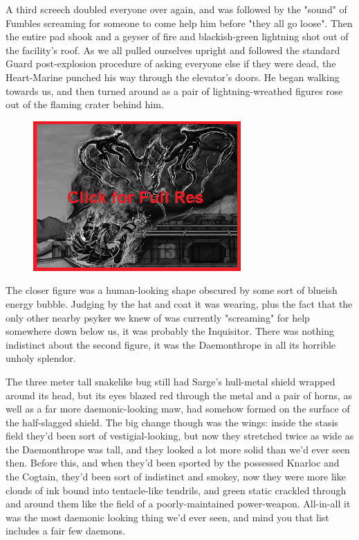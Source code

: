 A third screech doubled everyone over again, and was followed by the "sound" of Fumbles screaming for someone to come help him before "they all go loose". 
Then the entire pad shook and a geyser of fire and blackish-green lightning shot out of the facility's roof. 
As we all pulled ourselves upright and followed the standard Guard post-explosion procedure of asking everyone else if they were dead, the Heart-Marine punched his way through the elevator's doors. 
He began walking towards us, and then turned around as a pair of lightning-wreathed figures rose out of the flaming crater behind him.

\begin{figure}
	\begin{center}
		\includegraphics[width=\figwidth]{pics/16/17.png}
	\end{center}
\end{figure}
The closer figure was a human-looking shape obscured by some sort of blueish energy bubble. 
Judging by the hat and coat it was wearing, plus the fact that the only other nearby psyker we knew of was currently "screaming" for help somewhere down below us, it was probably the Inquisitor. 
There was nothing indistinct about the second figure, it was the Daemonthrope in all its horrible unholy splendor.

The three meter tall snakelike bug still had Sarge's hull-metal shield wrapped around its head, but its eyes blazed red through the metal and a pair of horns, as well as a far more daemonic-looking maw, had somehow formed on the surface of the half-slagged shield. 
The big change though was the wings: 
inside the stasis field they'd been sort of vestigial-looking, but now they stretched twice as wide as the Daemonthrope was tall, and they looked a lot more solid than we'd ever seen then. 
Before this, and when they'd been sported by the possessed Knarloc and the Cogtain, they'd been sort of indistinct and smokey, now they were more like clouds of ink bound into tentacle-like tendrils, and green static crackled through and around them like the field of a poorly-maintained power-weapon. 
All-in-all it was the most daemonic looking thing we'd ever seen, and mind you that list includes a fair few daemons.

